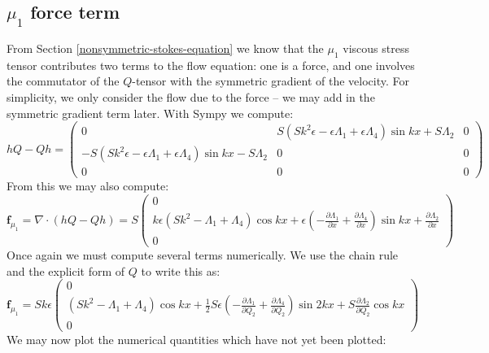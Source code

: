 \documentclass[reqno]{article}
\begin{document}
\subsection{$\mu_1$ force term}
From Section \ref{nonsymmetric-stokes-equation} we know that the $\mu_1$ viscous
stress tensor contributes two terms to the flow equation: one is a force, and
one involves the commutator of the $Q$-tensor with the symmetric gradient of the
velocity.
For simplicity, we only consider the flow due to the force -- we may add in the
symmetric gradient term later.
With Sympy we compute:
\begin{equation}
  hQ - Qh
  =
  \begin{pmatrix}
    0 & S \left( S k^2 \epsilon - \epsilon \Lambda_1 + \epsilon \Lambda_4 \right) \sin kx + S \Lambda_2 & 0 \\
    -S \left( S k^2 \epsilon - \epsilon \Lambda_1 + \epsilon \Lambda_4 \right) \sin kx - S \Lambda_2 & 0 & 0 \\
    0 & 0 & 0
  \end{pmatrix}
\end{equation}
From this we may also compute:
\begin{equation}
  \mathbf{f}_{\mu_1}
  =
  \nabla \cdot (hQ - Qh)
  =
  S
  \begin{pmatrix}
    0 \\
    k \epsilon \left( S k^2 - \Lambda_1 + \Lambda_4 \right) \cos kx
    + \epsilon \left( -\frac{\partial \Lambda_1}{\partial x} + \frac{\partial \Lambda_4}{\partial x}  \right) \sin kx
    + \frac{\partial \Lambda_2}{\partial x} \\
    0
  \end{pmatrix}
\end{equation}
Once again we must compute several terms numerically.
We use the chain rule and the explicit form of $Q$ to write this as:
\begin{equation}
  \mathbf{f}_{\mu_1}
  =
  S k \epsilon
  \begin{pmatrix}
    0 \\
    \left( S k^2 - \Lambda_1 + \Lambda_4 \right) \cos kx
    + \tfrac12 S \epsilon \left( -\frac{\partial \Lambda_1}{\partial Q_2} + \frac{\partial \Lambda_4}{\partial Q_2}  \right) \sin 2 kx
    + S \frac{\partial \Lambda_2}{\partial Q_2} \cos kx \\
    0
  \end{pmatrix}
\end{equation}
We may now plot the numerical quantities which have not yet been plotted:
\end{document}

